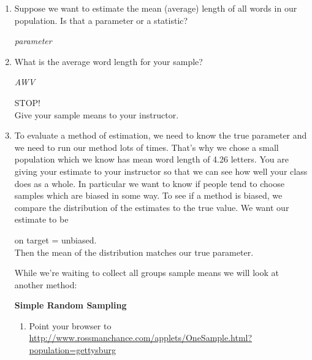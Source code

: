 \begin{enumerate}
\item Suppose we want to estimate the mean (average) length of all
  words in our population. Is that a parameter or a statistic?
\begin{students}
  \vspace{1cm}
\end{students}    
\begin{key}
   {\it parameter}
\end{key}
\item What is the average word length for your sample?
\begin{students}
  \vspace{1cm}
\end{students}    
\begin{key}
   {\it AWV}
\end{key}

  \begin{center}
    {\huge STOP!}\\
Give your sample means to your instructor.
  \end{center}

\item To evaluate a method of estimation, we need to know the true
  parameter and we need to run our method lots of times.  That's why we
  chose a small population which we know has mean word length of 4.26
  letters. You are giving your estimate to your instructor so that we
  can see how well your class does as a whole.  In particular we want
  to know if people tend to choose samples which are biased in some
  way. To see if a method is biased, we compare the distribution of
  the estimates to the true value.  We want our estimate to be
  \begin{center}
    {\large on target = unbiased.}\\
  Then the mean of the distribution matches our true parameter.
  \end{center}
  While we're waiting to collect all groups sample means we will look
  at another method:
  \begin{center}
    {\bf Simple Random Sampling}
  \end{center}
  \begin{enumerate}
    \item Point your browser to \\

\url{http://www.rossmanchance.com/applets/OneSample.html?population=gettysburg}
  
     


\end{enumerate}
\end{enumerate}
